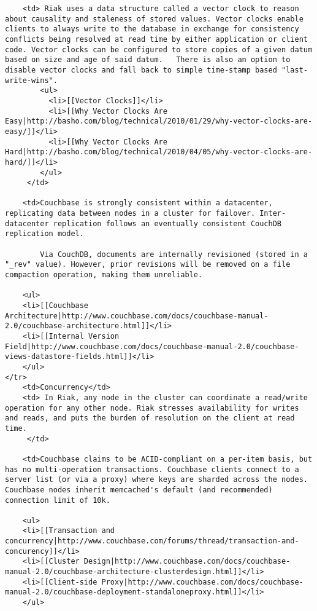 \documentclass[letter]{book}
\newcounter{tab}[chapter]
\begin{document}
\begin{shaded}
\begin{verbatim}
    <td> Riak uses a data structure called a vector clock to reason about causality and staleness of stored values. Vector clocks enable clients to always write to the database in exchange for consistency conflicts being resolved at read time by either application or client code. Vector clocks can be configured to store copies of a given datum based on size and age of said datum.   There is also an option to disable vector clocks and fall back to simple time-stamp based "last-write-wins".
        <ul>
          <li>[[Vector Clocks]]</li>
          <li>[[Why Vector Clocks Are Easy|http://basho.com/blog/technical/2010/01/29/why-vector-clocks-are-easy/]]</li>
          <li>[[Why Vector Clocks Are Hard|http://basho.com/blog/technical/2010/04/05/why-vector-clocks-are-hard/]]</li>
        </ul>
     </td>

    <td>Couchbase is strongly consistent within a datacenter, replicating data between nodes in a cluster for failover. Inter-datacenter replication follows an eventually consistent CouchDB replication model.

        Via CouchDB, documents are internally revisioned (stored in a "_rev" value). However, prior revisions will be removed on a file compaction operation, making them unreliable.

    <ul>
    <li>[[Couchbase Architecture|http://www.couchbase.com/docs/couchbase-manual-2.0/couchbase-architecture.html]]</li>
    <li>[[Internal Version Field|http://www.couchbase.com/docs/couchbase-manual-2.0/couchbase-views-datastore-fields.html]]</li>
    </ul>
</tr>
    <td>Concurrency</td>
    <td> In Riak, any node in the cluster can coordinate a read/write operation for any other node. Riak stresses availability for writes and reads, and puts the burden of resolution on the client at read time.
     </td>

    <td>Couchbase claims to be ACID-compliant on a per-item basis, but has no multi-operation transactions. Couchbase clients connect to a server list (or via a proxy) where keys are sharded across the nodes. Couchbase nodes inherit memcached's default (and recommended) connection limit of 10k.

    <ul>
    <li>[[Transaction and concurrency|http://www.couchbase.com/forums/thread/transaction-and-concurency]]</li>
    <li>[[Cluster Design|http://www.couchbase.com/docs/couchbase-manual-2.0/couchbase-architecture-clusterdesign.html]]</li>
    <li>[[Client-side Proxy|http://www.couchbase.com/docs/couchbase-manual-2.0/couchbase-deployment-standaloneproxy.html]]</li>
    </ul>


\end{verbatim}
\end{shaded}
\end{document}
